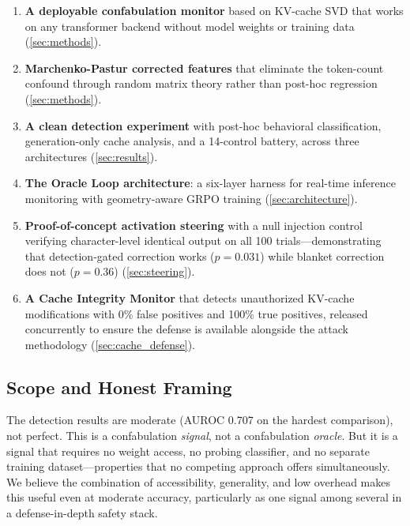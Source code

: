 \begin{enumerate}[nosep]
  \item \textbf{A deployable confabulation monitor} based on KV-cache SVD
    that works on any transformer backend without model weights or
    training data (\cref{sec:methods}).
  \item \textbf{Marchenko-Pastur corrected features} that eliminate
    the token-count confound through random matrix theory rather than
    post-hoc regression (\cref{sec:methods}).
  \item \textbf{A clean detection experiment} with post-hoc behavioral
    classification, generation-only cache analysis, and a 14-control
    battery, across three architectures (\cref{sec:results}).
  \item \textbf{The Oracle Loop architecture}: a six-layer harness for
    real-time inference monitoring with geometry-aware GRPO training
    (\cref{sec:architecture}).
  \item \textbf{Proof-of-concept activation steering} with a null
    injection control verifying character-level identical output on all
    100 trials---demonstrating that detection-gated correction works
    ($p = 0.031$) while blanket correction does not ($p = 0.36$)
    (\cref{sec:steering}).
  \item \textbf{A Cache Integrity Monitor} that detects unauthorized
    KV-cache modifications with 0\% false positives and 100\% true
    positives, released concurrently to ensure the defense is available
    alongside the attack methodology (\cref{sec:cache_defense}).
\end{enumerate}

\subsection{Scope and Honest Framing}

The detection results are moderate (AUROC 0.707 on the hardest
comparison), not perfect. This is a confabulation \emph{signal}, not a
confabulation \emph{oracle}. But it is a signal that requires no
weight access, no probing classifier, and no separate training
dataset---properties that no competing approach offers simultaneously. We believe the
combination of accessibility, generality, and low overhead makes this
useful even at moderate accuracy, particularly as one signal among several
in a defense-in-depth safety stack.

